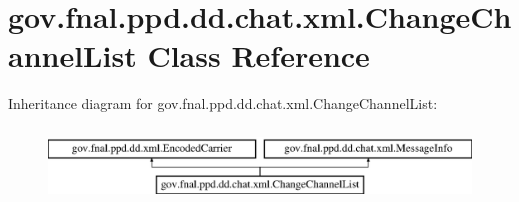 \hypertarget{classgov_1_1fnal_1_1ppd_1_1dd_1_1chat_1_1xml_1_1ChangeChannelList}{\section{gov.\-fnal.\-ppd.\-dd.\-chat.\-xml.\-Change\-Channel\-List Class Reference}
\label{classgov_1_1fnal_1_1ppd_1_1dd_1_1chat_1_1xml_1_1ChangeChannelList}
}
Inheritance diagram for gov.\-fnal.\-ppd.\-dd.\-chat.\-xml.\-Change\-Channel\-List\-:\begin{figure}[H]
\begin{center}
\leavevmode
\includegraphics[height=2.000000cm]{classgov_1_1fnal_1_1ppd_1_1dd_1_1chat_1_1xml_1_1ChangeChannelList}
\end{center}
\end{figure}
